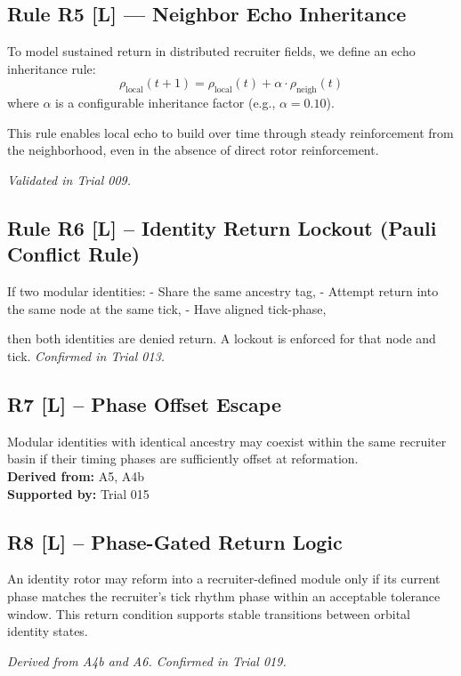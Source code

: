 \documentclass[12pt]{article}
\begin{document}
\subsection*{Rule R5 [L] — Neighbor Echo Inheritance}
To model sustained return in distributed recruiter fields, we define an echo inheritance rule:
\[
\rho_{\text{local}}(t+1) = \rho_{\text{local}}(t) + \alpha \cdot \rho_{\text{neigh}}(t)
\]
where \( \alpha \) is a configurable inheritance factor (e.g., \( \alpha = 0.10 \)).

This rule enables local echo to build over time through steady reinforcement from the neighborhood, even in the absence of direct rotor reinforcement.

\textit{Validated in Trial 009.}

\subsection*{Rule R6 [L] – Identity Return Lockout (Pauli Conflict Rule)}

If two modular identities:
- Share the same ancestry tag,
- Attempt return into the same node at the same tick,
- Have aligned tick-phase,

then both identities are denied return. A lockout is enforced for that node and tick.  
\textit{Confirmed in Trial 013.}

\subsection*{R7 [L] – Phase Offset Escape}
Modular identities with identical ancestry may coexist within the same recruiter basin if their timing phases are sufficiently offset at reformation.\\
\textbf{Derived from:} A5, A4b \\
\textbf{Supported by:} Trial 015

\subsection*{R8 [L] – Phase-Gated Return Logic}
An identity rotor may reform into a recruiter-defined module only if its current phase matches the recruiter’s tick rhythm phase within an acceptable tolerance window. This return condition supports stable transitions between orbital identity states.

\textit{Derived from A4b and A6. Confirmed in Trial 019.}
\end{document}
